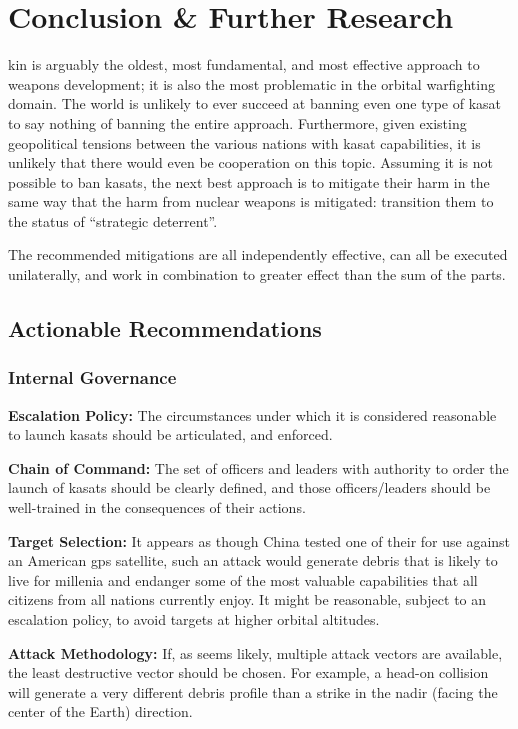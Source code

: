 \section{Conclusion \& Further Research}

\ac{kin} is arguably the oldest, most fundamental, and most effective
approach to weapons development; it is also the most problematic in
the orbital warfighting domain.  The world is unlikely to ever succeed
at banning even one type of \ac{kasat} to say nothing of banning the
entire approach.  Furthermore, given existing geopolitical tensions
between the various nations with \ac{kasat} capabilities, it is
unlikely that there would even be cooperation on this topic.  Assuming
it is not possible to ban \acp{kasat}, the next best approach is to
mitigate their harm in the same way that the harm from nuclear weapons
is mitigated: transition them to the status of ``strategic
deterrent''.

The recommended mitigations are all independently effective, can all
be executed unilaterally, and work in combination to greater effect
than the sum of the parts.


\subsection{Actionable Recommendations}

\subsubsection{Internal Governance}

\textbf{Escalation Policy:} The circumstances under which it is
considered reasonable to launch \acp{kasat} should be articulated, and
enforced.

\textbf{Chain of Command:} The set of officers and leaders with
authority to order the launch of \acp{kasat} should be clearly
defined, and those officers/leaders should be well-trained in the
consequences of their actions.

\textbf{Target Selection:} It appears as though China tested one of
their  for use against an American \ac{gps} satellite,
such an attack would generate debris that is likely to live for
millenia and endanger some of the most valuable capabilities that all
citizens from all nations currently enjoy.  It might be reasonable,
subject to an escalation policy, to avoid targets at higher orbital
altitudes.

\textbf{Attack Methodology:} If, as seems likely, multiple attack
vectors are available, the least destructive vector should be chosen.
For example, a head-on collision will generate a very different debris
profile than a strike in the nadir (facing the center of the Earth)
direction.

